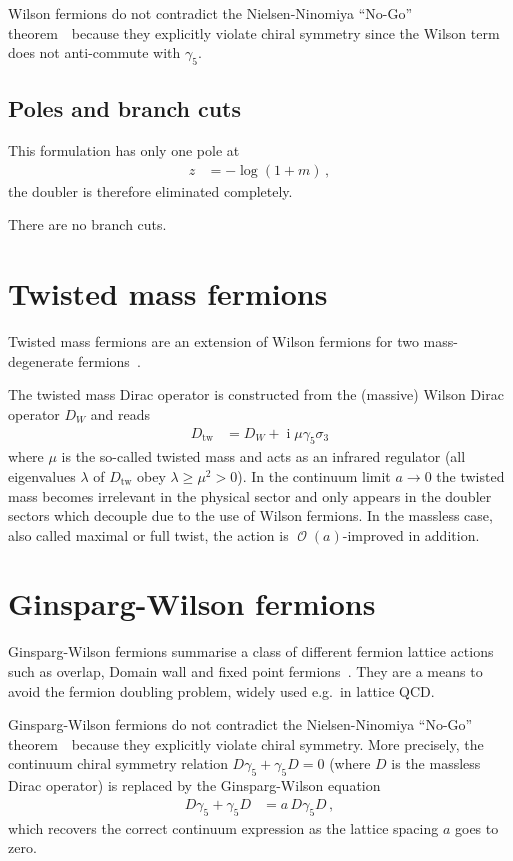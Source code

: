 \documentclass[a4paper]{article}
\DeclareMathOperator{\im}{i}
\DeclareMathOperator{\ord}{\mathcal{O}}
\newcommand{\ordnung}[1]{\ensuremath{\ord\left(#1\right)}}
\newcommand{\nnt}{Nielsen-Ninomiya ``No-Go'' theorem~\cite{NIELSEN1981219}}
\begin{document}
	Wilson fermions do not contradict the \nnt\ because they explicitly violate chiral symmetry since the Wilson term does not anti-commute with $\gamma_5$.
	
	\subsection{Poles and branch cuts}
	This formulation has only one pole at
	\begin{align}
		z &= -\log\left(1+m\right)\,,
	\end{align}
	the doubler is therefore eliminated completely.
	
	There are no branch cuts.
	
	\section{Twisted mass fermions}
	Twisted mass fermions are an extension of Wilson fermions for two mass-degenerate fermions~\cite{twisted_mass_2000,Gattringer:2010zz,Intro_chiral_sym,JANSEN2005362}.
	
	The twisted mass Dirac operator is constructed from the (massive) Wilson Dirac operator $D_W$ and reads
	\begin{align}
		D_\text{tw} &= D_W + \im\mu\gamma_5\sigma_3
	\end{align}
	where $\mu$ is the so-called twisted mass and acts as an infrared regulator (all eigenvalues $\lambda$ of $D_\text{tw}$ obey $\lambda\ge\mu^2>0$). In the continuum limit $a\rightarrow0$ the twisted mass becomes irrelevant in the physical sector and only appears in the doubler sectors which decouple due to the use of Wilson fermions. In the massless case, also called maximal or full twist, the action is $\ordnung{a}$-improved in addition.
		
	\section{Ginsparg-Wilson fermions}
	Ginsparg-Wilson fermions summarise a class of different fermion lattice actions such as overlap, Domain wall and fixed point fermions~\cite{Ginsparg_Wilson,Gattringer:2010zz,Rothe:2005,Intro_chiral_sym}. They are a means to avoid the fermion doubling problem, widely used e.g.\ in lattice QCD.
	
	Ginsparg-Wilson fermions do not contradict the \nnt\ because they explicitly violate chiral symmetry. More precisely, the continuum chiral symmetry relation $D\gamma_5+\gamma_5 D=0$ (where $D$ is the massless Dirac operator) is replaced by the Ginsparg-Wilson equation
	\begin{align}
		D\gamma_5 + \gamma_5 D &= a\,D\gamma_5 D\,,\label{eq:ginsparg_wilson_eq}
	\end{align}
	which recovers the correct continuum expression as the lattice spacing $a$ goes to zero.
	
\end{document}
